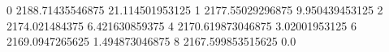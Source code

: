 0 2188.71435546875 21.114501953125
1 2177.55029296875 9.950439453125
2 2174.021484375 6.421630859375
4 2170.619873046875 3.02001953125
6 2169.0947265625 1.494873046875
8 2167.599853515625 0.0
